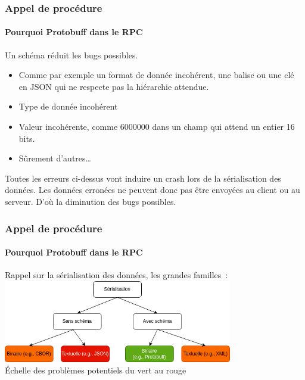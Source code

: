 \documentclass{beamer}
\begin{document}
    \begin{frame}
        \transdissolve
        \frametitle{Appel de procédure}
        \framesubtitle{Pourquoi Protobuff dans le RPC}
        Un schéma réduit les bugs possibles.
        \begin{itemize}
            \item Comme par exemple un format de donnée incohérent, une balise ou une clé en JSON qui ne respecte pas la hiérarchie attendue.
            \item Type de donnée incohérent
            \item Valeur incohérente, comme 6000000 dans un champ qui attend un entier 16 bits.
            \item Sûrement d'autres\ldots
        \end{itemize}
        \bigbreak
        Toutes les erreurs ci-dessus vont induire un crash lors de la sérialisation des données.
        Les données erronées ne peuvent donc pas être envoyées au client ou au serveur.
        D'où la diminution des bugs possibles.
    \end{frame}

    \begin{frame}
        \transdissolve
        \frametitle{Appel de procédure}
        \framesubtitle{Pourquoi Protobuff dans le RPC}
        Rappel sur la sérialisation des données, les grandes familles~:
        \bigbreak
        \centering
        \includegraphics[width=10cm]{image/serialization.drawio} \\ Échelle des problèmes potentiels du vert au rouge \\
    \end{frame}
\end{document}
